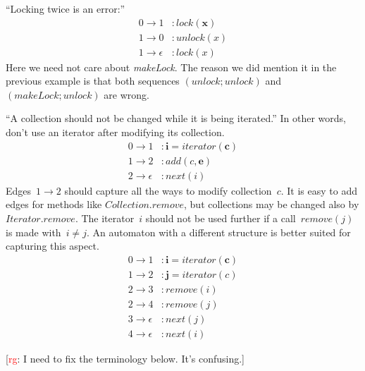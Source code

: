 \documentclass[a4paper]{article}
\newcommand{\rg}[1]{\todo{rg}{#1}}
\newcommand{\todo}[2]{{\small [\textcolor{red}{#1}: #2]}}
\theoremstyle{slanted}
\theoremstyle{definition}
\theoremstyle{remark}
\begin{document}
``Locking twice is an error:''
\begin{equation}
\begin{aligned}
0\to1&: \mathit{lock}(\mathbf x)\\
1\to0&: \mathit{unlock}(x)\\
1\to\epsilon&: \mathit{lock}(x)
\end{aligned}
\end{equation}
Here we need not care about \textit{makeLock}.
The reason we did mention it in the previous example is that both sequences $(\mathit{unlock}; \mathit{unlock})$ and $(\mathit{makeLock}; \mathit{unlock})$ are wrong.

``A collection should not be changed while it is being iterated.''
In other words, don't use an iterator after modifying its collection.
\begin{equation}\label{eq:iter1}
\begin{aligned}
0\to1&: \mathbf{i} = \mathit{iterator}(\mathbf{c})\\
1\to2&: \mathit{add}(c, \mathbf{e}) \\
2\to\epsilon&: \mathit{next}(i)
\end{aligned}
\end{equation}
Edges~$1\to2$ should capture all the ways to modify collection~$c$.
It is easy to add edges for methods like $\mathit{Collection}.\mathit{remove}$, but collections may be changed also by $\mathit{Iterator}.\mathit{remove}$.
The iterator~$i$ should not be used further if a call~$\mathit{remove}(j)$ is made with~$i\ne j$.
An automaton with a different structure is better suited for capturing this aspect.
\begin{equation}\label{eq:iter2}
\begin{aligned}
0\to1&: \mathbf{i} = \mathit{iterator}(\mathbf{c})\\
1\to2&: \mathbf{j} = \mathit{iterator}(c)\\
2\to3&: \mathit{remove}(i)\\
2\to4&: \mathit{remove}(j)\\
3\to\epsilon&: \mathit{next}(j)\\
4\to\epsilon&: \mathit{next}(i)
\end{aligned}
\end{equation}

\rg{I need to fix the terminology below. It's confusing.}
\end{document}

